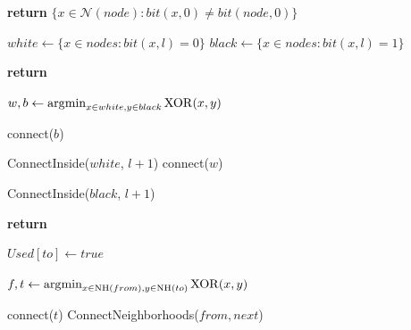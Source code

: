 \documentclass[conference]{IEEEtran}
\theoremstyle{definition}
\DeclareMathOperator*{\argmin}{\arg\!\min}
\newcommand{\cN}{{\mathcal{N}}}
\begin{document}
\begin{algorithm}
    \begin{algorithmic}[1]

           
            \State \textbf{return} $ \{x \in \cN(node): bit(x, 0) \ne bit(node, 0)\} $
        \EndFunction

    \end{algorithmic}
\end{algorithm}

\begin{algorithm}
    \begin{algorithmic}[1]

            \State $white \gets \{x \in nodes: bit(x, l) = 0\}$
            \State $black \gets \{x \in nodes: bit(x, l) = 1\}$
            
                \State \textbf{return}
            \EndIf

            \State $w,b \gets \argmin_{x \in white, y \in black}{\rm XOR}(x, y)$

                    \State connect($b$)
                \EndIf
                
                \State ConnectInside($white$, $l + 1$)
            \Else
                    \State connect($w$)
                \EndIf

                \State ConnectInside($black$, $l + 1$)
            \EndIf
        \EndProcedure
        
    \end{algorithmic}
\end{algorithm}

\begin{algorithm}
    \begin{algorithmic}[1]
        
                \State \textbf{return}      %
            \EndIf
                
            \State $Used[to] \gets true$

                \State $f, t \gets \argmin_{x \in {\rm NH}(from), y \in {\rm NH}(to)}{\rm XOR}(x, y)$

                    \State connect($t$)
                \EndIf
            \Else
                \For {$next \in \cN(to) \setminus {\rm NH}(to)$}
                    \State ConnectNeighborhoods($from, next$)
                \EndFor
            \EndIf

        \EndProcedure
    \end{algorithmic}
\end{algorithm}
\end{document}
